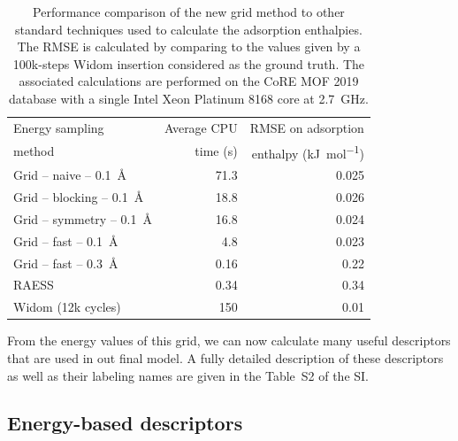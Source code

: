 \documentclass[main]{subfiles}
\begin{document}
\setlength{\extrarowheight}{0.1cm}
\begin{table}[ht]
    \begin{tabular}{|l|r|r|}
        \hline
        Energy sampling  &  Average CPU & RMSE on adsorption  \\
        method &  time (s)  &  enthalpy (\si{\kilo\joule\per\mole}) \\[0.5mm]
        \hline
        Grid -- naive -- \SI{0.1}{\angstrom} &  71.3 & 0.025  \\[0.5mm]
        Grid -- blocking -- \SI{0.1}{\angstrom} &  18.8 & 0.026  \\
        Grid -- symmetry -- \SI{0.1}{\angstrom} &  16.8 & 0.024  \\
        Grid -- fast -- \SI{0.1}{\angstrom} &  4.8 & 0.023  \\
        Grid -- fast -- \SI{0.3}{\angstrom} &  0.16 & 0.22  \\
        RAESS\cite{Ren_2023}  &  0.34 & 0.34  \\
        Widom\cite{Widom1963} (12k cycles) &  150 & 0.01  \\
        \hline
    \end{tabular}
    \caption{Performance comparison of the new grid method to other standard techniques used to calculate the adsorption enthalpies. The RMSE is calculated by comparing to the values given by a 100k-steps Widom insertion considered as the ground truth. The associated calculations are performed on the CoRE MOF 2019 database with a single Intel Xeon Platinum 8168 core at 2.7~GHz.}\label{tab:grid}
\end{table}

From the energy values of this grid, we can now calculate many useful descriptors that are used in out final model. A fully detailed description of these descriptors as well as their labeling names are given in the Table~S2 of the SI.

\subsection{Energy-based descriptors}





\OnlyInSubfile{\printglobalbibliography}
\end{document}
